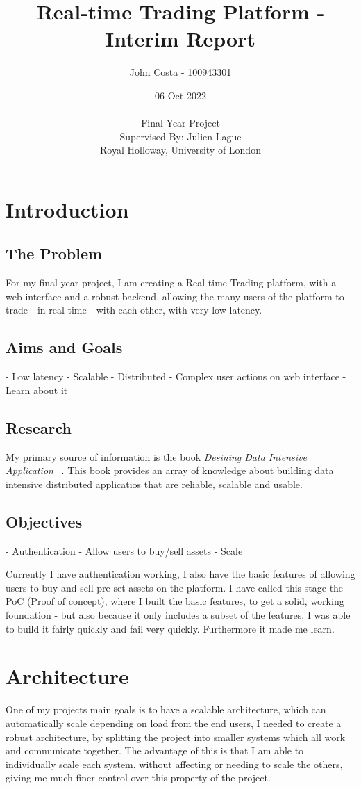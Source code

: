 \documentclass[titlepage]{article}
\title{Real-time Trading Platform - Interim Report}
\author{John Costa - 100943301}
\date{06 Oct 2022 \\
  \\
  \Large{Final Year Project \\
Supervised By: Julien Lague \\
Royal Holloway, University of London}}
\begin{document}
\maketitle

\section{Introduction}
\subsection{The Problem}
For my final year project, I am creating a Real-time Trading platform, with a web interface and a robust backend, allowing the many users of the platform to trade - in real-time - with each other, with very low latency.

\subsection{Aims and Goals}
- Low latency
- Scalable
- Distributed
- Complex user actions on web interface
- Learn about it


\subsection{Research}
My primary source of information is the book \textit{Desining Data Intensive Application} ~\cite{kleppmann_2021}. This book provides an array of knowledge about building data intensive distributed applicatios that are reliable, scalable and usable.

\subsection{Objectives}
- Authentication
- Allow users to buy/sell assets
- Scale

Currently I have authentication working, I also have the basic features of allowing users to buy and sell pre-set assets on the platform. I have called this stage the PoC (Proof of concept), where I built the basic features, to get a solid, working foundation - but also because it only includes a subset of the features, I was able to build it fairly quickly and fail very quickly. Furthermore it made me learn.

\section{Architecture}
One of my projects main goals is to have a scalable architecture, which can automatically scale depending on load from the end users, I needed to create a robust architecture, by splitting the project into smaller systems which all work and communicate together. The advantage of this is that I am able to individually scale each system, without affecting or needing to scale the others, giving me much finer control over this property of the project. \\
\end{document}

